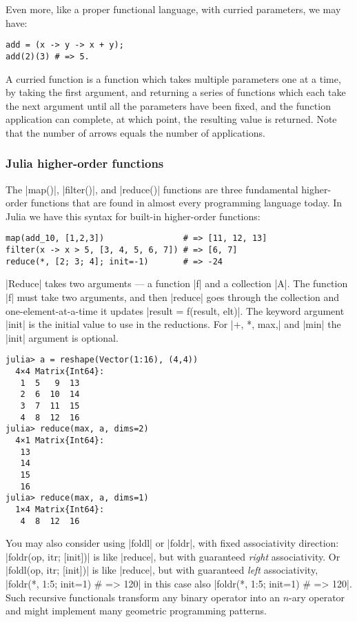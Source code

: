 \begin{coding}
Even more, like a proper functional language, with curried parameters, we may have: 
\begin{lstlisting}[language=JuliaLocal, style=julia, mathescape=false]
add = (x -> y -> x + y); 
add(2)(3) # => 5.
\end{lstlisting}
A curried function is a function which takes multiple parameters one at a time, by taking the first argument, and returning a series of functions which each take the next argument until all the parameters have been fixed, and the function application can complete, at which point, the resulting value is returned. Note that the number of arrows equals the number of applications.
\end{coding}


\subsubsection*{Julia higher-order functions}

The |map()|, |filter()|, and |reduce()| functions are three fundamental higher-order functions that are found in almost every programming language today.
In Julia we have this syntax for built-in higher-order functions:

\begin{lstlisting}[language=JuliaLocal, style=julia, mathescape=false]
map(add_10, [1,2,3])  				# => [11, 12, 13]
filter(x -> x > 5, [3, 4, 5, 6, 7]) # => [6, 7]
reduce(*, [2; 3; 4]; init=-1)  		# => -24
\end{lstlisting}

\noindent |Reduce| takes two arguments — a function |f| and a collection |A|. The function |f| must take two arguments, and then |reduce| goes through the collection and one-element-at-a-time it updates |result = f(result, elt)|. The keyword argument |init| is the initial value to use in the reductions. For |+, *, max,| and |min| the |init| argument is optional. 

\begin{lstlisting}[language=JuliaLocal, style=julia, mathescape=false]
julia> a = reshape(Vector(1:16), (4,4))
  4×4 Matrix{Int64}:
   1  5   9  13
   2  6  10  14
   3  7  11  15
   4  8  12  16
julia> reduce(max, a, dims=2)
  4×1 Matrix{Int64}:
   13
   14
   15
   16
julia> reduce(max, a, dims=1)
  1×4 Matrix{Int64}:
   4  8  12  16
\end{lstlisting}


You may also consider using |foldl| or |foldr|, with fixed associativity direction: |foldr(op, itr; [init])| is like |reduce|, but with guaranteed \emph{right} associativity. Or |foldl(op, itr; [init])| is like |reduce|, but with guaranteed \emph{left} associativity, 
|foldr(*, 1:5; init=1) # => 120| in this case also |foldr(*, 1:5; init=1) # => 120|. Such recursive functionals transform any binary operator into an $n$-ary operator and might implement many geometric programming patterns.

